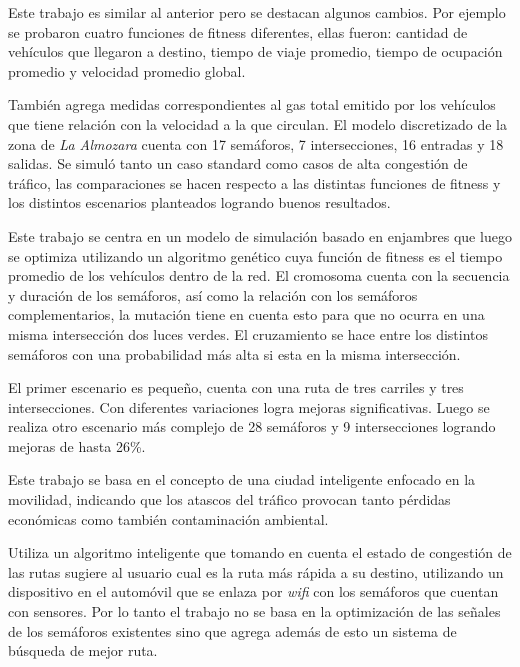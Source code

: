 \begin{itemize}
\begin{item}
Este trabajo es similar al anterior pero se destacan algunos cambios. Por ejemplo se probaron cuatro funciones de fitness diferentes, ellas fueron: cantidad de vehículos que llegaron a destino, tiempo de viaje promedio, tiempo de ocupación promedio y velocidad promedio global.

También agrega medidas correspondientes al gas total emitido por los vehículos que tiene relación con la velocidad a la que circulan.
El modelo discretizado de la zona de \emph{La Almozara} cuenta con 17 semáforos, 7 intersecciones, 16 entradas y 18 salidas.
Se simuló tanto un caso standard como casos de alta congestión de tráfico, las comparaciones se hacen respecto a las distintas funciones de fitness y los distintos escenarios planteados logrando buenos resultados.

\end{item}


\begin{item}

Este trabajo se centra en un modelo de simulación basado en enjambres que luego se optimiza utilizando un algoritmo genético cuya función de fitness es el tiempo promedio de los vehículos dentro de la red. El cromosoma cuenta con la secuencia y duración de los semáforos, así como la relación con los semáforos complementarios, la mutación tiene en cuenta esto para que no ocurra en una misma intersección dos luces verdes. El cruzamiento se hace entre los distintos semáforos con una probabilidad más alta si esta en la misma intersección.

El primer escenario es pequeño, cuenta con una ruta de tres carriles y tres intersecciones. Con diferentes variaciones logra mejoras significativas.
Luego se realiza otro escenario más complejo de 28 semáforos y 9 intersecciones logrando mejoras de hasta 26\%.
\end{item}	


\begin{item}

Este trabajo se basa en el concepto de una ciudad inteligente enfocado en la movilidad, indicando que los atascos del tráfico provocan tanto pérdidas económicas como también contaminación ambiental.

Utiliza un algoritmo inteligente que tomando en cuenta el estado de congestión de las rutas sugiere al usuario cual es la ruta más rápida a su destino, utilizando un dispositivo en el automóvil que se enlaza por \emph{wifi} con los semáforos que cuentan con sensores. Por lo tanto el trabajo no se basa en la optimización de las señales de los semáforos existentes sino que agrega además de esto un sistema de búsqueda de mejor ruta.


\end{item}
\end{itemize}
